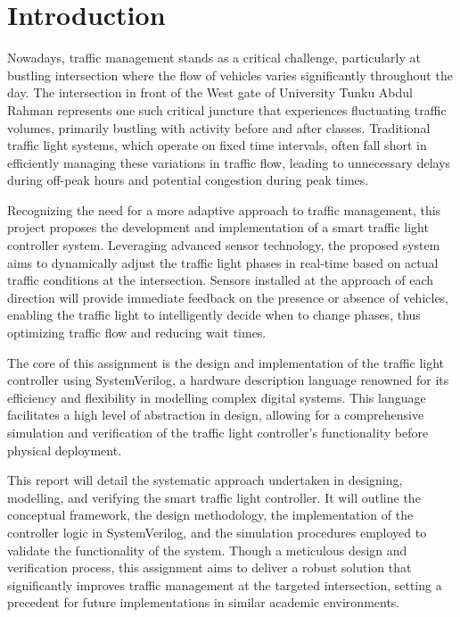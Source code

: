 \section{Introduction}
Nowadays, traffic management stands as a critical challenge, particularly at bustling intersection where the flow of vehicles varies significantly throughout the day. The intersection in front of the West gate of University Tunku Abdul Rahman represents one such critical juncture that experiences fluctuating traffic volumes, primarily bustling with activity before and after classes. Traditional traffic light systems, which operate on fixed time intervals, often fall short in efficiently managing these variations in traffic flow, leading to unnecessary delays during off-peak hours and potential congestion during peak times.

Recognizing the need for a more adaptive approach to traffic management, this project proposes the development and implementation of a smart traffic light controller system. Leveraging advanced sensor technology, the proposed system aims to dynamically adjust the traffic light phases in real-time based on actual traffic conditions at the intersection. Sensors installed at the approach of each direction will provide immediate feedback on the presence or absence of vehicles, enabling the traffic light to intelligently decide when to change phases, thus optimizing traffic flow and reducing wait times.

The core of this assignment is the design and implementation of the traffic light controller using SystemVerilog, a hardware description language renowned for its efficiency and flexibility in modelling complex digital systems. This language facilitates a high level of abstraction in design, allowing for a comprehensive simulation and verification of the traffic light controller’s functionality before physical deployment.

This report will detail the systematic approach undertaken in designing, modelling, and verifying the smart traffic light controller. It will outline the conceptual framework, the design methodology, the implementation of the controller logic in SystemVerilog, and the simulation procedures employed to validate the functionality of the system. Though a meticulous design and verification process, this assignment aims to deliver a robust solution that significantly improves traffic management at the targeted intersection, setting a precedent for future implementations in similar academic environments.
